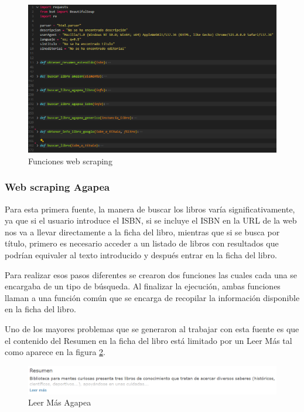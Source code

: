\begin{figure}[h]
    \centering
    \includegraphics[width=1\linewidth]{Imagenes/Funciones web scraping.png}
    \caption{Funciones web scraping}
    \label{Funciones web scraping}
\end{figure}
\FloatBarrier

\subsubsection{Web scraping Agapea}
Para esta primera fuente, la manera de buscar los libros varía significativamente, ya que si el usuario introduce el ISBN, si se incluye el ISBN en la URL de la web nos va a llevar directamente a la ficha del libro, mientras que si se busca por título, primero es necesario acceder a un listado de libros con resultados que podrían equivaler al texto introducido y después entrar en la ficha del libro.

Para realizar esos pasos diferentes se crearon dos funciones las cuales cada una se encargaba de un tipo de búsqueda. Al finalizar la ejecución, ambas funciones llaman a una función común que se encarga de recopilar la información disponible en la ficha del libro.


Uno de los mayores problemas que se generaron al trabajar con esta fuente es que el contenido del Resumen en la ficha del libro está limitado por un Leer Más tal como aparece en la figura \ref{Leer Más Agapea}.


\begin{figure}[h]
    \centering
    \includegraphics[width=1\linewidth]{Imagenes/leerMasAgapea.png}
    \caption{Leer Más Agapea}
    \label{Leer Más Agapea}
\end{figure}
\FloatBarrier



